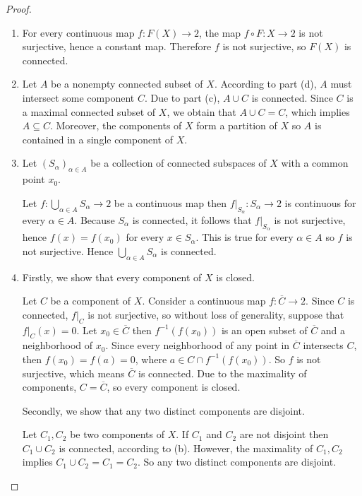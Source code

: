 \begin{proof}
    \begin{enumerate}[itemsep=0pt,label={(\alph*)}]
        \item For every continuous map \( f: F(X) \to 2 \), the map \( f \circ F: X \to 2 \) is not surjective, hence a constant map. Therefore \( f \) is not surjective, so \( F(X) \) is connected.
        \item Let \( A \) be a nonempty connected subset of \( X \). According to part (d), \( A \) must intersect some component \( C \). Due to part (c), \( A \cup C \) is connected. Since \( C \) is a maximal connected subset of \( X \), we obtain that \( A \cup C = C \), which implies \( A \subseteq C \). Moreover, the components of \( X \) form a partition of \( X \) so \( A \) is contained in a single component of \( X \).
        \item Let \( {\left( S_{\alpha} \right)}_{\alpha \in A} \) be a collection of connected subspaces of \( X \) with a common point \( x_{0} \).

              Let \( f: \bigcup_{\alpha \in A} S_{\alpha} \to 2 \) be a continuous map then \( f\vert_{S_{\alpha}}: S_{\alpha} \to 2 \) is continuous for every \( \alpha \in A \). Because \( S_{\alpha} \) is connected, it follows that \( f\vert_{S_{\alpha}} \) is not surjective, hence \( f(x) = f(x_{0}) \) for every \( x \in S_{\alpha} \). This is true for every \( \alpha \in A \) so \( f \) is not surjective. Hence \( \bigcup_{\alpha \in A} S_{\alpha} \) is connected.
        \item Firstly, we show that every component of \( X \) is closed.

              Let \( C \) be a component of \( X \). Consider a continuous map \( f: \overline{C} \to 2 \). Since \( C \) is connected, \( f\vert_{C} \) is not surjective, so without loss of generality, suppose that \( f\vert_{C}(x) = 0 \). Let \( x_{0} \in \overline{C} \) then \( f^{-1}(f(x_{0})) \) is an open subset of \( \overline{C} \) and a neighborhood of \( x_{0} \). Since every neighborhood of any point in \( \overline{C} \) intersects \( C \), then \( f(x_{0}) = f(a) = 0 \), where \( a \in C \cap f^{-1}(f(x_{0})) \). So \( f \) is not surjective, which means \( \overline{C} \) is connected. Due to the maximality of components, \( C = \overline{C} \), so every component is closed.

              Secondly, we show that any two distinct components are disjoint.

              Let \( C_{1}, C_{2} \) be two components of \( X \). If \( C_{1} \) and \( C_{2} \) are not disjoint then \( C_{1} \cup C_{2} \) is connected, according to (b). However, the maximality of \( C_{1}, C_{2} \) implies \( C_{1} \cup C_{2} = C_{1} = C_{2} \). So any two distinct components are disjoint.


\end{enumerate}
\end{proof}
